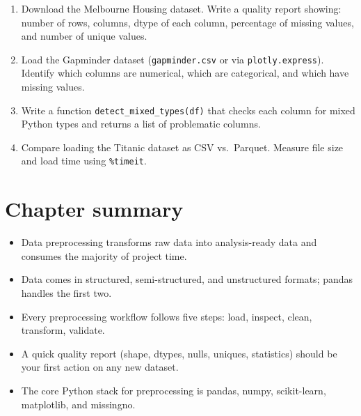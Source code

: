 \begin{exercise}
\begin{enumerate}
  \item Download the Melbourne Housing dataset. Write a quality report showing: number of rows, columns, dtype of each column, percentage of missing values, and number of unique values.
  \item Load the Gapminder dataset (\texttt{gapminder.csv} or via \texttt{plotly.express}). Identify which columns are numerical, which are categorical, and which have missing values.
  \item Write a function \texttt{detect\_mixed\_types(df)} that checks each column for mixed Python types and returns a list of problematic columns.
  \item Compare loading the Titanic dataset as CSV vs.\ Parquet. Measure file size and load time using \texttt{\%timeit}.
\end{enumerate}
\end{exercise}

\section{Chapter summary}

\begin{itemize}
  \item Data preprocessing transforms raw data into analysis-ready data and consumes the majority of project time.
  \item Data comes in structured, semi-structured, and unstructured formats; pandas handles the first two.
  \item Every preprocessing workflow follows five steps: load, inspect, clean, transform, validate.
  \item A quick quality report (shape, dtypes, nulls, uniques, statistics) should be your first action on any new dataset.
  \item The core Python stack for preprocessing is pandas, numpy, scikit-learn, matplotlib, and missingno.
\end{itemize}
